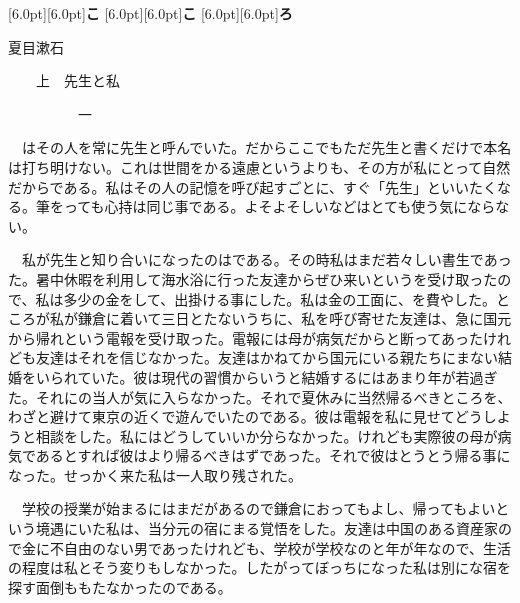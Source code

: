 \documentclass[a4j,onecolumn]{tarticle}
\begin{document}
\raisebox{0pt}[6.0pt][6.0pt]{\Huge\mcfamily\bfseries こ}
\raisebox{0pt}[6.0pt][6.0pt]{\Huge\mcfamily\bfseries こ}
\raisebox{0pt}[6.0pt][6.0pt]{\Huge\mcfamily\bfseries ろ}



\hfill 夏目漱石







\par{}\par{}



\par{}　　上　先生と私
\par{}\par{}　　　　　一
\par{}
　はその人を常に先生と呼んでいた。\hbox{}だからここでもただ先生と書くだけで本名は打ち明けない。\hbox{}これは世間をかる遠慮というよりも、\hbox{}その方が私にとって自然だからである。\hbox{}私はその人の記憶を呼び起すごとに、\hbox{}すぐ「先生」といいたくなる。\hbox{}筆をっても心持は同じ事である。\hbox{}よそよそしいなどはとても使う気にならない。\hbox{}\par{}
　私が先生と知り合いになったのはである。\hbox{}その時私はまだ若々しい書生であった。\hbox{}暑中休暇を利用して海水浴に行った友達からぜひ来いというを受け取ったので、\hbox{}私は多少の金をして、\hbox{}出掛ける事にした。\hbox{}私は金の工面に、\hbox{}を費やした。\hbox{}ところが私が鎌倉に着いて三日とたないうちに、\hbox{}私を呼び寄せた友達は、\hbox{}急に国元から帰れという電報を受け取った。\hbox{}電報には母が病気だからと断ってあったけれども友達はそれを信じなかった。\hbox{}友達はかねてから国元にいる親たちにまない結婚をいられていた。\hbox{}彼は現代の習慣からいうと結婚するにはあまり年が若過ぎた。\hbox{}それにの当人が気に入らなかった。\hbox{}それで夏休みに当然帰るべきところを、\hbox{}わざと避けて東京の近くで遊んでいたのである。\hbox{}彼は電報を私に見せてどうしようと相談をした。\hbox{}私にはどうしていいか分らなかった。\hbox{}けれども実際彼の母が病気であるとすれば彼はより帰るべきはずであった。\hbox{}それで彼はとうとう帰る事になった。\hbox{}せっかく来た私は一人取り残された。\hbox{}\par{}
　学校の授業が始まるにはまだがあるので鎌倉におってもよし、\hbox{}帰ってもよいという境遇にいた私は、\hbox{}当分元の宿にまる覚悟をした。\hbox{}友達は中国のある資産家ので金に不自由のない男であったけれども、\hbox{}学校が学校なのと年が年なので、\hbox{}生活の程度は私とそう変りもしなかった。\hbox{}したがってぼっちになった私は別にな宿を探す面倒ももたなかったのである。\hbox{}\par{}
\end{document}
